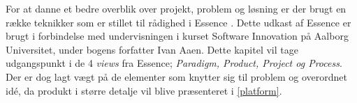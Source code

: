 For at danne et bedre overblik over projekt, problem og løsning er der brugt en række teknikker som er stillet til rådighed i Essence \cite{art:essence}.
Dette udkast af Essence er brugt i forbindelse med undervisningen i kurset Software Innovation på Aalborg Universitet, under bogens forfatter Ivan Aaen.
Dette kapitel vil tage udgangspunkt i de 4 \textit{views} fra Essence; \textit{Paradigm, Product, Project og Process}.
Der er dog lagt vægt på de elementer som knytter sig til problem og overordnet idé, da produkt i større detalje vil blive præsenteret i \cref{platform}.

